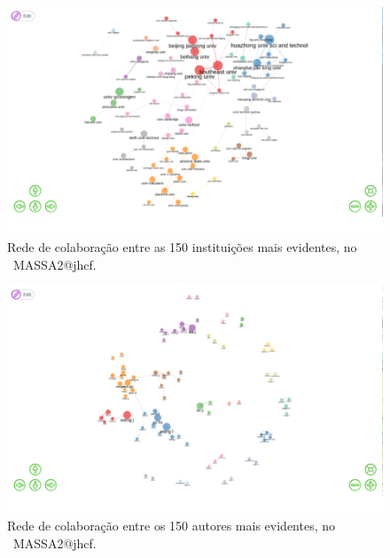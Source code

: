 \begin{figure}
    \centering
    \includegraphics[width=1\textwidth]{experiments/jhcf/PesqBibliogr/SimulacaoMultiagente/WoS-20220203/Estrutura/Social/MASSA2-Collaboration-Network-150instit.png}
    \caption{Rede de colaboração entre as 150 instituições mais evidentes, no  \dataset\ MASSA2@jhcf.}
    \label{fig:MASSA2-Collaboration-Network-150instit}
\end{figure}

\begin{figure}
    \centering
    \includegraphics[width=1\textwidth]{experiments/jhcf/PesqBibliogr/SimulacaoMultiagente/WoS-20220203/Estrutura/Social/MASSA2-Collaboration-Network-150authors.png}
    \caption{Rede de colaboração entre os 150 autores mais evidentes, no  \dataset\ MASSA2@jhcf.}
    \label{fig:MASSA2-Collaboration-Network-150authors}
\end{figure}

